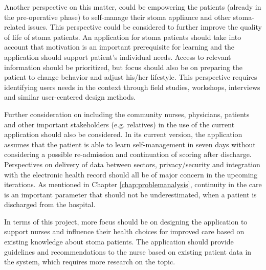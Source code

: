 Another perspective on this matter, could be empowering the patients (already in the pre-operative phase) to self-manage their stoma appliance and other stoma-related issues. This perspective could be considered to further improve the quality of life of stoma patients. An application for stoma patients should take into account that motivation is an important prerequisite for learning and the application should support patient's individual needs. Access to relevant information should be prioritized, but focus should also be on preparing the patient to change behavior and adjust his/her lifestyle. This perspective requires identifying users needs in the context through field studies, workshops, interviews and similar user-centered design methods. 

Further consideration on including the community nurses, physicians, patients and other important stakeholders (e.g. relatives) in the use of the current application should also be considered. In its current version, the application assumes that the patient is able to learn self-management in seven days without considering a possible re-admission and continuation of scoring after discharge. Perspectives on delivery of data between sectors, privacy/security and integration with the electronic health record should all be of major concern in the upcoming iterations. As mentioned in Chapter \ref{chap:problemanalysis}, continuity in the care is an important parameter that should not be underestimated, when a patient is discharged from the hospital. 

In terms of this project, more focus should be on designing the  application to support nurses and influence their health choices for improved care based on existing knowledge about stoma patients. The application should provide guidelines and recommendations to the nurse based on existing patient data in the system, which requires more research on the topic. 









%
%







